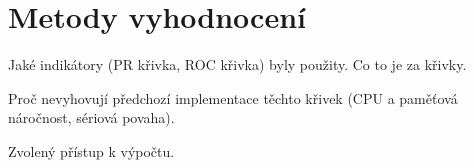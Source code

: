 \chapter{Metody vyhodnocení}

Jaké indikátory (PR křivka, ROC křivka) byly použity. Co to je za křivky.

Proč nevyhovují předchozí implementace těchto křivek (CPU a paměťová náročnost, sériová povaha).

Zvolený přístup k výpočtu.
